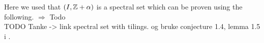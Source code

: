 \documentclass[../thesis.tex]{subfiles}
\begin{document}
Here we used that $\left(I, \mathbb{Z}+\alpha\right)$ is a spectral set which can be proven using the following.
$\Longrightarrow$ Todo\\
TODO Tanke -> link spectral set with tilings. og bruke conjecture 1.4, lemma 1.5 i \cite{jorgensenSpectralPairsCartesian2001}. 




\end{document}
